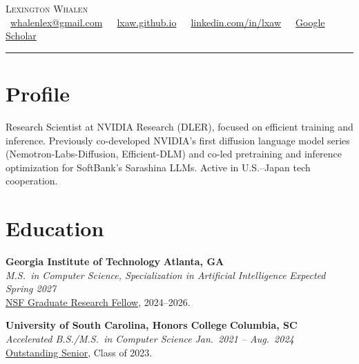 \documentclass[10pt,a4paper]{article}
\newcommand{\cvlink}[2]{\href{#1}{#2}}
\newcommand{\entry}[4]{%
  \noindent\textbf{#1} \hfill \textbf{#2}\\
  \textit{#3} \hfill \textit{#4}%
}
\begin{document}
\begin{center}
  {\LARGE\scshape Lexington Whalen}\\[5pt]
  \faEnvelope\ \cvlink{mailto:whalenlex@gmail.com}{whalenlex@gmail.com} \,\textperiodcentered\,
  \faGlobe\ \cvlink{https://lxaw.github.io}{lxaw.github.io} \,\textperiodcentered\,
  \faLinkedin\ \cvlink{https://www.linkedin.com/in/lxaw/}{linkedin.com/in/lxaw} \,\textperiodcentered\,
  \faGraduationCap\ \cvlink{https://scholar.google.com/citations?user=FE17fUMAAAAJ&hl=en}{Google Scholar}\\[6pt]
  \rule{\textwidth}{0.8pt}
\end{center}

\section{Profile}
Research Scientist at NVIDIA Research (DLER), focused on efficient training and inference. Previously co-developed NVIDIA's first diffusion language model series (Nemotron-Labs-Diffusion, Efficient-DLM) and co-led pretraining and inference optimization for SoftBank's Sarashina LLMs. Active in U.S.--Japan tech cooperation.

\section{Education}

\entry{Georgia Institute of Technology}{Atlanta, GA}{M.S.\ in Computer Science, Specialization in Artificial Intelligence}{Expected Spring 2027}\\
{\footnotesize \cvlink{https://cse.sc.edu/news/lex-whalen-wins-nsf-graduate-research-fellowship}{NSF Graduate Research Fellow}, 2024--2026.}

\medskip
\entry{University of South Carolina, Honors College}{Columbia, SC}{Accelerated B.S./M.S.\ in Computer Science}{Jan.\ 2021 -- Aug.\ 2024}\\
{\footnotesize \cvlink{https://web.cse.sc.edu/news/outstanding-senior-award-2023}{Outstanding Senior}, Class of 2023.}

\end{document}
